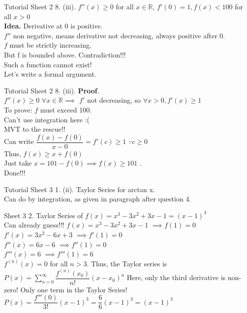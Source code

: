 \documentclass[aspectratio=169]{beamer}
\begin{document}
\begin{frame}{Tutorial Sheet 2}
    8. (iii). $f''(x) \geq 0$ for all $x \in \mathbb{R}$, $f'(0) = 1, f(x) <100$ for all $x>0$ \\
    \medskip 
    \textbf{Idea.}
    Derivative at 0 is positive. \\
    $f''$ non negative, means derivative not decreasing, always positive after 0. \\
    $f$ must be strictly increasing.\\
    But f is bounded above. Contradiction!!! \\
    Such a function cannot exist! \\
    Let's write a formal argument. \\
\end{frame}

\begin{frame}{Tutorial Sheet 2}
    8. (iii). \textbf{Proof}. \\
    $f''(x) \geq 0$  \hspace{5pt} $ \forall x \in \mathbb{R} \implies $ $f'$ not decreasing, so $\forall x>0, f'(x)\geq 1$ \\
    To prove: $f$ must exceed 100. \\
    \medskip
    Can't use integration here :( \\
    MVT to the rescue!! \\
    \medskip
    Can write $\dfrac{f(x)-f(0)}{x-0} = f'(c) \geq 1$ $\because c \geq 0$ \\
    Thus, $f(x)\geq x+f(0)$ \\
    \smallskip
    Just take $x=101-f(0) \implies f(x) \geq 101$ . \\
    Done!!!
\end{frame}

\begin{frame}{Tutorial Sheet 3}
    1. (ii). Taylor Series for arctan x. \\
    Can do by integration, as given in paragraph after question 4.
\end{frame}

\begin{frame}{Sheet 3}
    2. Taylor Series of $f(x)=x^3-3x^2+3x-1 = (x-1)^3$ \\
    Can already guess!!!
    \smallskip
    $f(x)=x^3-3x^2+3x-1$ $\implies f(1)=0$  \\
    \smallskip
    $f'(x)=3x^2-6x+3$ $\implies f'(1)=0$\\
    \smallskip
    $f''(x)=6x-6$   $\implies f''(1)=0$\\
    \smallskip
    $f'''(x)=6$ $\implies f'''(1)=6$\\
    \smallskip
    $f^{(n)}(x)=0$ for all $n>3$. 
    \medskip
    Thus, the Taylor series is \\
    $P(x)=\displaystyle \sum_{n=0}^{\infty}\dfrac{f^{(n)}(x_0)}{n!}(x-x_0)^n$ 
    Here, only the third derivative is non-zero! Only one term in the Taylor Series! 
    $P(x)=\dfrac{f'''(0)}{3!}(x-1)^3=\dfrac{6}{6}(x-1)^3=(x-1)^3$
\end{frame}
\end{document}
